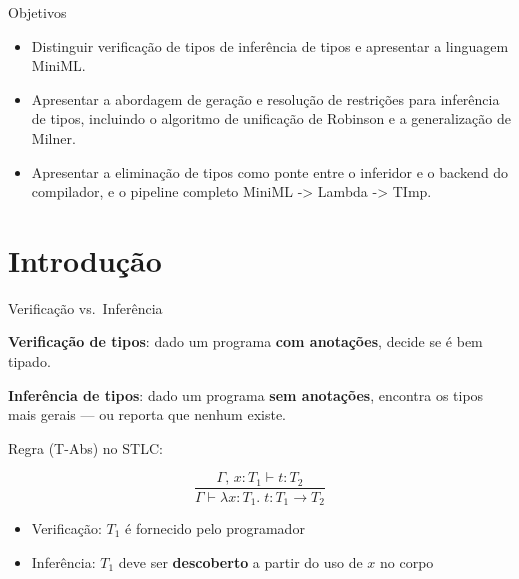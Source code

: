\subtitle{\bf Aula 21 - Introdução}
\begin{frame}[t,plain]
    \titlepage
\end{frame}

\begin{frame}{Objetivos}

    \begin{itemize}
        \item
        Distinguir verificação de tipos de inferência de tipos e apresentar a
        linguagem MiniML.
        \item
        Apresentar a abordagem de geração e resolução de restrições para
        inferência de tipos, incluindo o algoritmo de unificação de Robinson e
        a generalização de Milner.
        \item
        Apresentar a eliminação de tipos como ponte entre o inferidor e o
        backend do compilador, e o pipeline completo MiniML -> Lambda -> TImp.
    \end{itemize}
\end{frame}


\section{Introdução}\label{introduuxe7uxe3o}

\begin{frame}{Verificação vs.~Inferência}

    \textbf{Verificação de tipos}: dado um programa \textbf{com anotações},
    decide se é bem tipado.

    \textbf{Inferência de tipos}: dado um programa \textbf{sem anotações},
    encontra os tipos mais gerais --- ou reporta que nenhum existe.

    Regra (T-Abs) no STLC:

    \[\frac{\Gamma,\, x : T_1 \vdash t : T_2}{\Gamma \vdash \lambda x {:} T_1.\; t : T_1 \to T_2}\]

    \begin{itemize}

        \item
        Verificação: \(T_1\) é fornecido pelo programador
        \item
        Inferência: \(T_1\) deve ser \textbf{descoberto} a partir do uso de
        \(x\) no corpo
    \end{itemize}
\end{frame}


